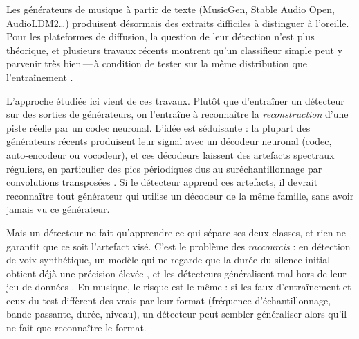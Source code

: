 \documentclass[a4paper, 11pt]{article}
\begin{document}
Les générateurs de musique à partir de texte (MusicGen, Stable Audio Open, AudioLDM2\dots) produisent
désormais des extraits difficiles à distinguer à l'oreille. Pour les plateformes de diffusion, la question
de leur détection n'est plus théorique, et plusieurs travaux récents montrent qu'un classifieur simple peut
y parvenir très bien\,---\,à condition de tester sur la même distribution que l'entraînement
\cite{afchar2024easy, afchar2025challenges}.

L'approche étudiée ici vient de ces travaux. Plutôt que d'entraîner un détecteur sur des sorties de
générateurs, on l'entraîne à reconnaître la \emph{reconstruction} d'une piste réelle par un codec neuronal.
L'idée est séduisante : la plupart des générateurs récents produisent leur signal avec un décodeur neuronal
(codec, auto-encodeur ou vocodeur), et ces décodeurs laissent des artefacts spectraux réguliers, en
particulier des pics périodiques dus au suréchantillonnage par convolutions transposées
\cite{pons2021upsampling, afchar2025fourier}. Si le détecteur apprend ces artefacts, il devrait reconnaître
tout générateur qui utilise un décodeur de la même famille, sans avoir jamais vu ce générateur.

Mais un détecteur ne fait qu'apprendre ce qui sépare ses deux classes, et rien ne garantit que ce soit
l'artefact visé. C'est le problème des \emph{raccourcis} \cite{geirhos2020shortcut} : en détection de
voix synthétique, un modèle qui ne regarde que la durée du silence initial obtient déjà une précision
élevée \cite{muller2021silence}, et les détecteurs généralisent mal hors de leur jeu de données
\cite{muller2022generalize}. En musique, le risque est le même : si les faux d'entraînement et ceux du test
diffèrent des vrais par leur format (fréquence d'échantillonnage, bande passante, durée, niveau), un
détecteur peut sembler généraliser alors qu'il ne fait que reconnaître le format.
\end{document}
